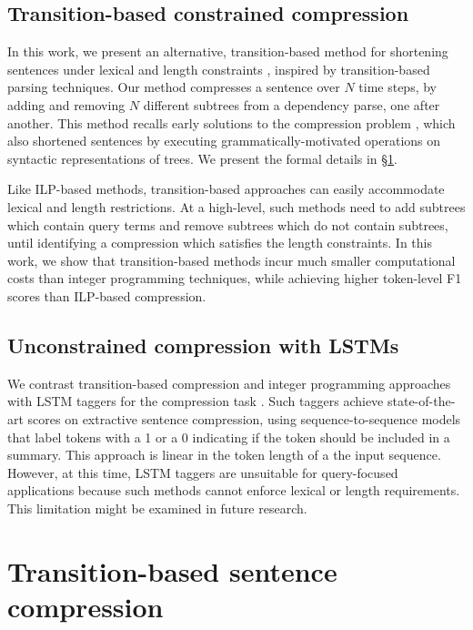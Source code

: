 \documentclass[11pt,a4paper]{article}
\begin{document}
\subsection{Transition-based constrained compression}

In this work, we present an alternative, transition-based method for shortening sentences under lexical and length constraints \cite{Earley1970AnEC,nivre2003}, inspired by transition-based parsing techniques. Our method compresses a sentence over $N$ time steps, by adding and removing $N$ different subtrees from a dependency parse, one after another. This method recalls early solutions to the compression problem \cite{Jing2000SentenceRF,Knight2000StatisticsBasedS}, which also shortened sentences by executing grammatically-motivated operations on syntactic representations of trees. We present the formal details in \S\ref{s:system}.

Like ILP-based methods, transition-based approaches can easily accommodate lexical and length restrictions. At a high-level, such methods need to add subtrees which contain query terms and remove subtrees which do not contain subtrees, until identifying a compression which satisfies the length constraints. In this work, we show that transition-based methods incur much smaller computational costs than integer programming techniques, while achieving higher token-level F1 scores than ILP-based compression.

\subsection{Unconstrained compression with LSTMs}

We contrast transition-based compression and integer programming approaches with LSTM taggers for the compression task \cite{filippova2015sentence}. Such taggers achieve state-of-the-art scores on extractive sentence compression, using sequence-to-sequence models that label tokens with a 1 or a 0 indicating if the token should be included in a summary. This approach is linear in the token length of a the input sequence. However, at this time, LSTM taggers are unsuitable for query-focused applications because such methods cannot enforce lexical or length requirements. This limitation might be examined in future research.

\section{Transition-based sentence compression}\label{s:system}
\end{document}
